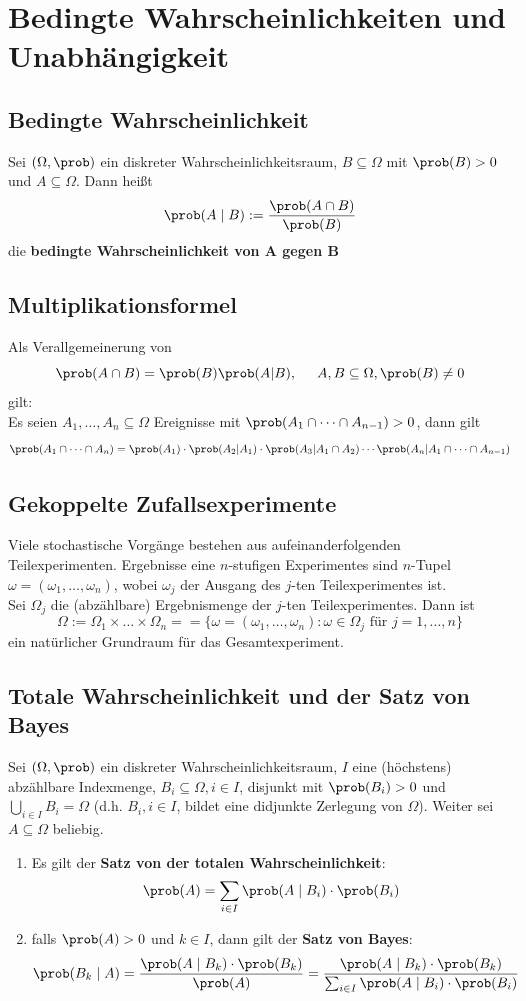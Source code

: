 \documentclass{kit}
\begin{document}
\section{Bedingte Wahrscheinlichkeiten und Unabhängigkeit}
  \subsection{Bedingte Wahrscheinlichkeit}
    Sei $(\Omega,\prob)$ ein diskreter Wahrscheinlichkeitsraum, $B\subseteq\Omega$ mit $\prob(B)>0$ und $A\subseteq\Omega$.
    Dann heißt
    $$\prob(A\mid B):=\frac{\prob(A\cap B)}{\prob(B)}$$
    die \textbf{bedingte Wahrscheinlichkeit von A gegen B}
  \subsection{Multiplikationsformel}
    Als Verallgemeinerung von
    $$\prob(A\cap B)=\prob(B)\prob(A|B),\hspace{0.5cm}A,B\subseteq\Omega,\prob(B)\neq0$$
    gilt:\\
    Es seien $A_1,\dots,A_n\subseteq\Omega$ Ereignisse mit $\prob(A_1\cap\dots\cap A_{n-1})>0$, dann gilt
    $$\prob(A_1\cap\dots\cap A_n)=\prob(A_1)\cdot\prob(A_2|A_1)\cdot\prob(A_3|A_1\cap A_2)\cdots
    \prob(A_n|A_1\cap\dots\cap A_{n-1})$$
  \subsection{Gekoppelte Zufallsexperimente}
    Viele stochastische Vorgänge bestehen aus aufeinanderfolgenden Teilexperimenten. Ergebnisse eine $n$-stufigen
    Experimentes sind $n$-Tupel $\omega=(\omega_1,\dots,\omega_n)$, wobei $\omega_j$ der Ausgang des $j$-ten 
    Teilexperimentes ist.\\
    Sei $\Omega_j$ die (abzählbare) Ergebnismenge der $j$-ten Teilexperimentes. Dann ist
    $$\Omega:=\Omega_1\times\dots\times\Omega_n==\{\omega=(\omega_1,\dots,\omega_n):\omega\in\Omega_j\text{ für }
    j=1,\dots,n\}$$
    ein natürlicher Grundraum für das Gesamtexperiment.
  \subsection{Totale Wahrscheinlichkeit und der Satz von Bayes}
    Sei $(\Omega,\prob)$ ein diskreter Wahrscheinlichkeitsraum, $I$ eine (höchstens) abzählbare Indexmenge, 
    $B_i\subseteq\Omega,i\in I$, disjunkt mit $\prob(B_i)>0$ und $\bigcup_{i\in I}B_i=\Omega$ (d.h. $B_i,i\in I$, bildet
    eine didjunkte Zerlegung von $\Omega$). Weiter sei $A\subseteq\Omega$ beliebig.
    \begin{enumerate}[label=\roman*)]
      \item Es gilt der \textbf{Satz von der totalen Wahrscheinlichkeit}:
        $$\prob(A)=\sum_{i\in I}\prob(A\mid B_i)\cdot\prob(B_i)$$
      \item falls $\prob(A)>0$ und $k\in I$, dann gilt der \textbf{Satz von Bayes}:
        $$\prob(B_k\mid A)=\frac{\prob(A\mid B_k)\cdot\prob(B_k)}{\prob(A)}=\frac{\prob(A\mid B_k)\cdot\prob(B_k)}
        {\sum_{i\in I}\prob(A\mid B_i)\cdot\prob(B_i)}$$
    \end{enumerate}
\end{document}

